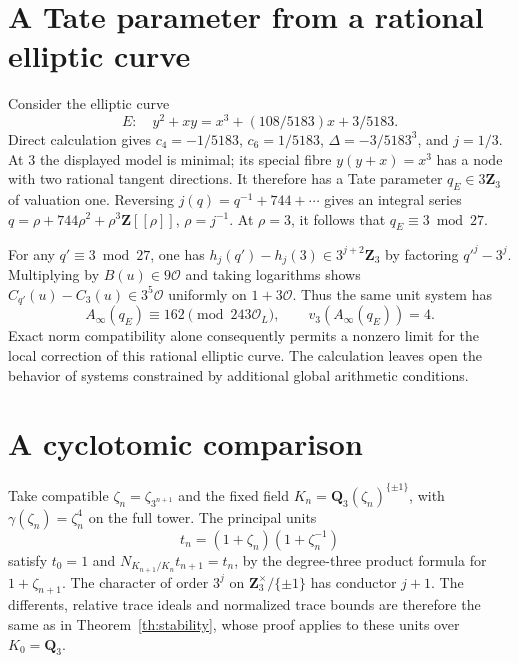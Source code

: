 \documentclass[11pt]{article}
\newcommand{\Z}{\mathbf Z}\newcommand{\Q}{\mathbf Q}
\newcommand{\cO}{\mathcal O}
\begin{document}
\section{A Tate parameter from a rational elliptic curve}

Consider the elliptic curve
\[
 E:\quad y^2+xy=x^3+(108/5183)x+3/5183.
\]
Direct calculation gives $c_4=-1/5183$, $c_6=1/5183$, $\Delta=-3/5183^3$, and $j=1/3$. At $3$ the displayed model is minimal; its special fibre $y(y+x)=x^3$ has a node with two rational tangent directions. It therefore has a Tate parameter $q_E\in3\Z_3$ of valuation one. Reversing $j(q)=q^{-1}+744+\cdots$ gives an integral series $q=\rho+744\rho^2+\rho^3\Z[[\rho]]$, $\rho=j^{-1}$. At $\rho=3$, it follows that $q_E\equiv3\bmod27$.

For any $q'\equiv3\bmod27$, one has $h_j(q')-h_j(3)\in3^{j+2}\Z_3$ by factoring $q'^j-3^j$. Multiplying by $B(u)\in9\cO$ and taking logarithms shows $C_{q'}(u)-C_3(u)\in3^5\cO$ uniformly on $1+3\cO$. Thus the same unit system has
\[
 A_\infty(q_E)\equiv162\pmod{243\cO_L},\qquad v_3(A_\infty(q_E))=4.
\]
Exact norm compatibility alone consequently permits a nonzero limit for the local correction of this rational elliptic curve. The calculation leaves open the behavior of systems constrained by additional global arithmetic conditions.
\section{A cyclotomic comparison}

Take compatible $\zeta_n=\zeta_{3^{n+1}}$ and the fixed field
$K_n=\Q_3(\zeta_n)^{\{\pm1\}}$, with $\gamma(\zeta_n)=\zeta_n^4$ on the full tower. The principal units
\[
 t_n=(1+\zeta_n)(1+\zeta_n^{-1})
\]
satisfy $t_0=1$ and $N_{K_{n+1}/K_n}t_{n+1}=t_n$, by the degree-three product formula for $1+\zeta_{n+1}$. The character of order $3^j$ on $\Z_3^\times/\{\pm1\}$ has conductor $j+1$. The differents, relative trace ideals and normalized trace bounds are therefore the same as in Theorem~\ref{th:stability}, whose proof applies to these units over $K_0=\Q_3$.
\end{document}
